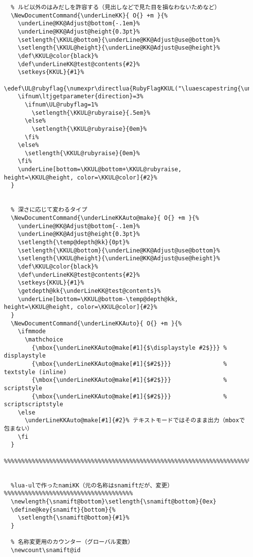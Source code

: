 \documentclass[luatex,fontsize=8pt,paper=b5,twoside]{jlreq}%
\begin{document}
\begin{lstlisting}
  % ルビ以外のはみだしを許容する（見出しなどで見た目を損なわないためなど）
  \NewDocumentCommand{\underLineKK}{ O{} +m }{%
    \underLine@KK@Adjust@bottom{-.1em}%
    \underLine@KK@Adjust@height{0.3pt}%
    \setlength{\KKUL@bottom}{\underLine@KK@Adjust@use@bottom}%
    \setlength{\KKUL@height}{\underLine@KK@Adjust@use@height}%
    \def\KKUL@color{black}%
    \def\underLineKK@test@contents{#2}%
    \setkeys{KKUL}{#1}%
    \edef\UL@rubyflag{\numexpr\directlua{RubyFlagKKUL("\luaescapestring{\unexpanded\expandafter{\underLineKK@test@contents}}")}\relax}%
    \ifnum\ltjgetparameter{direction}=3%
      \ifnum\UL@rubyflag=1%
        \setlength{\KKUL@rubyraise}{.5em}%
      \else%
        \setlength{\KKUL@rubyraise}{0em}%
      \fi%
    \else%
      \setlength{\KKUL@rubyraise}{0em}%
    \fi%
    \underLine[bottom=\KKUL@bottom+\KKUL@rubyraise, height=\KKUL@height, color=\KKUL@color]{#2}%
  }


  % 深さに応じて変わるタイプ
  \NewDocumentCommand{\underLineKKAuto@make}{ O{} +m }{%
    \underLine@KK@Adjust@bottom{-.1em}%
    \underLine@KK@Adjust@height{0.3pt}%
    \setlength{\temp@depth@kk}{0pt}%
    \setlength{\KKUL@bottom}{\underLine@KK@Adjust@use@bottom}%
    \setlength{\KKUL@height}{\underLine@KK@Adjust@use@height}%
    \def\KKUL@color{black}%
    \def\underLineKK@test@contents{#2}%
    \setkeys{KKUL}{#1}%
    \getdepth@kk{\underLineKK@test@contents}%
    \underLine[bottom=\KKUL@bottom-\temp@depth@kk, height=\KKUL@height, color=\KKUL@color]{#2}%
  }
  \NewDocumentCommand{\underLineKKAuto}{ O{} +m }{%
    \ifmmode
      \mathchoice
        {\mbox{\underLineKKAuto@make[#1]{$\displaystyle #2$}}} % displaystyle
        {\mbox{\underLineKKAuto@make[#1]{$#2$}}}               % textstyle (inline)
        {\mbox{\underLineKKAuto@make[#1]{$#2$}}}               % scriptstyle
        {\mbox{\underLineKKAuto@make[#1]{$#2$}}}               % scriptscriptstyle
    \else
      \underLineKKAuto@make[#1]{#2}% テキストモードではそのまま出力（mboxで包まない）
    \fi
  }
  %%%%%%%%%%%%%%%%%%%%%%%%%%%%%%%%%%%%%%%%%%%%%%%%%%%%%%%%%%%%%%%%%%%%%%%%%%%%%%%%%%%%%%%%%


  %lua-ulで作ったnamiKK（元の名称はsnamiftだが、変更）%%%%%%%%%%%%%%%%%%%%%%%%%%%%%%%%%%%%%
  \newlength{\snamift@bottom}\setlength{\snamift@bottom}{0ex}
  \define@key{snamift}{bottom}{%
    \setlength{\snamift@bottom}{#1}%
  }

  % 名称変更用のカウンター（グローバル変数）
  \newcount\snamift@id


\end{lstlisting}
\end{document}
